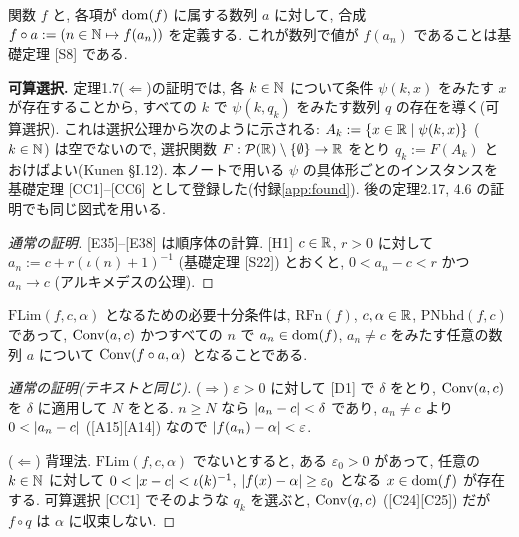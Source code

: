 関数 $f$ と, 各項が $\mathrm{dom}(f)$ に属する数列 $a$ に対して, 合成 $f \circ a := (n \in \mathbb{N} \mapsto f(a_n))$ を定義する. これが数列で値が $f(a_n)$ であることは基礎定理 [S8] である.

\medskip\noindent\textbf{可算選択.}\quad
定理1.7($\Leftarrow$)の証明では, 各 $k \in \mathbb{N}$ について条件 $\psi(k, x)$ をみたす $x$ が存在することから, すべての $k$ で $\psi(k, q_k)$ をみたす数列 $q$ の存在を導く(可算選択). これは選択公理から次のように示される: $A_k := \{x \in \mathbb{R} \mid \psi(k, x)\}$ ($k \in \mathbb{N}$) は空でないので, 選択関数 $F : \mathcal{P}(\mathbb{R}) \setminus \{\emptyset\} \to \mathbb{R}$ をとり $q_k := F(A_k)$ とおけばよい(Kunen \cite{kunen2011} \S I.12). 本ノートで用いる $\psi$ の具体形ごとのインスタンスを基礎定理 [CC1]--[CC6] として登録した(付録\ref{app:found}). 後の定理2.17, 4.6 の証明でも同じ図式を用いる.

\begin{lem}\label{lem:fun-aux}
\end{lem}
\begin{proof}[通常の証明]
  [E35]--[E38] は順序体の計算. [H1] $c \in \mathbb{R}$, $r > 0$ に対して $a_n := c + r(\iota(n) + 1)^{-1}$ (基礎定理 [S22]) とおくと, $0 < a_n - c < r$ かつ $a_n \to c$ (アルキメデスの公理).
\end{proof}

\begin{thm}\label{thm:seqcrit}
  $\mathrm{FLim}(f, c, \alpha)$ となるための必要十分条件は, $\mathrm{RFn}(f)$, $c, \alpha \in \mathbb{R}$, $\mathrm{PNbhd}(f, c)$ であって, $\mathrm{Conv}(a, c)$ かつすべての $n$ で $a_n \in \mathrm{dom}(f)$, $a_n \neq c$ をみたす任意の数列 $a$ について $\mathrm{Conv}(f \circ a, \alpha)$ となることである.
\end{thm}
\begin{proof}[通常の証明(テキストと同じ)]
  ($\Rightarrow$) $\varepsilon > 0$ に対して [D1] で $\delta$ をとり, $\mathrm{Conv}(a, c)$ を $\delta$ に適用して $N$ をとる. $n \geq N$ なら $\lvert a_n - c\rvert < \delta$ であり, $a_n \neq c$ より $0 < \lvert a_n - c\rvert$ ([A15][A14]) なので $\lvert f(a_n) - \alpha\rvert < \varepsilon$.

  ($\Leftarrow$) 背理法. $\mathrm{FLim}(f, c, \alpha)$ でないとすると, ある $\varepsilon_0 > 0$ があって, 任意の $k \in \mathbb{N}$ に対して $0 < \lvert x - c\rvert < \iota(k)^{-1}$, $\lvert f(x) - \alpha\rvert \geq \varepsilon_0$ となる $x \in \mathrm{dom}(f)$ が存在する. 可算選択 [CC1] でそのような $q_k$ を選ぶと, $\mathrm{Conv}(q, c)$ ([C24][C25]) だが $f \circ q$ は $\alpha$ に収束しない.
\end{proof}

